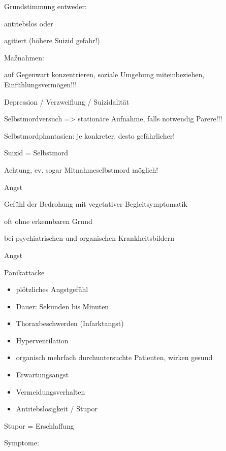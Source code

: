 \documentclass{article}
\begin{document}
Grundstimmung entweder:

antriebslos  oder

agitiert (h\"ohere Suizid gefahr!)

Ma{\ss}nahmen:

auf Gegenwart konzentrieren, soziale  Umgebung miteinbeziehen, 
Einf\"uhlungsverm\"ogen!!!

Depression / Verzweiflung / Suizidalit\"at

Selbstmordversuch ={\textgreater} station\"are  Aufnahme, falls
notwendig Parere!!!

Selbstmordphantasien: je konkreter,  desto gef\"ahrlicher!

Suizid = Selbstmord

Achtung, ev. sogar Mitnahmeselbstmord  m\"oglich!

Angst

Gef\"uhl der Bedrohung mit vegetativer  Begleitsymptomatik

oft ohne erkennbaren Grund

bei psychiatrischen und organischen  Krankheitsbildern

Angst

Panikattacke

\begin{itemize}
\item pl\"otzliches Angstgef\"uhl

\item Dauer: Sekunden bis Minuten

\item Thoraxbeschwerden (Infarktangst)

\item Hyperventilation

\item organisch mehrfach durchuntersuchte  Patienten, wirken gesund

\item Erwartungsangst

\item Vermeidungsverhalten

\item Antriebslosigkeit / Stupor

\end{itemize}
Stupor = Erschlaffung

Symptome:
\end{document}

